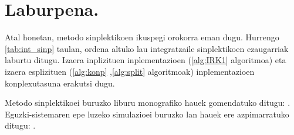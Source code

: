\section{Laburpena.}

Atal honetan, metodo sinplektikoen ikuspegi orokorra eman dugu. Hurrengo \ref{tab:int_sinp} taulan, ordena altuko lau integratzaile sinplektikoen ezaugarriak laburtu ditugu. Izaera inplizituen inplementazioen (\ref{alg:IRK1} algoritmoa) eta izaera esplizituen (\ref{alg:konp} ,\ref{alg:split} algoritmoak) inplementazioen  konplexutasuna erakutsi dugu. 


\begin{table}[h!]
\centering
\caption{Integrazio metodo sinplektikoen laburpena}
\label{tab:int_sinp}       %
\end{table}
 
 
 Metodo sinplektikoei buruzko liburu monografiko hauek gomendatuko ditugu: \cite{JMSanz-Serna1994,Hairer2006,Leimkuhler2004,Feng2010}. Eguzki-sistemaren epe luzeko simulazioei buruzko lan hauek ere azpimarratuko ditugu: \cite{Brumberg2013,Kholshevnikov2007,Morbidelli2002,Ito2007,Kaplan2015}.
